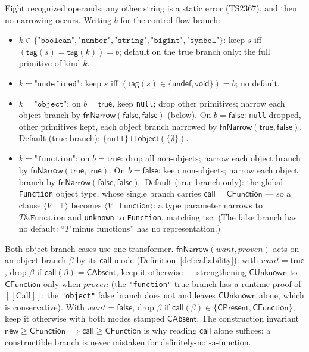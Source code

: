 \documentclass[11pt]{article}
\newcommand{\tagfn}{\mathsf{tag}}
\newcommand{\clause}[2]{\langle #1 \mid #2 \rangle}
\begin{document}
Eight recognized operands; any other string is a static error (TS2367), and
then no narrowing occurs. Writing $b$ for the control-flow branch:
\begin{itemize}
\item $k \in \{\texttt{"boolean"}, \texttt{"number"}, \texttt{"string"},
  \texttt{"bigint"}, \texttt{"symbol"}\}$: keep $s$ iff
  $(\tagfn(s) = \tagfn(k)) = b$; default on the true branch only:
  the full primitive of kind $k$.
\item $k = \texttt{"undefined"}$: keep $s$ iff
  $(\tagfn(s) \in \{\mathsf{undef},\mathsf{void}\}) = b$; no default.
\item $k = \texttt{"object"}$: on $b = \mathsf{true}$, keep \texttt{null};
  drop other primitives; narrow each object branch by
  $\mathsf{fnNarrow}(\mathsf{false}, \mathsf{false})$ (below). On
  $b = \mathsf{false}$: \texttt{null} dropped, other primitives kept,
  each object branch narrowed by
  $\mathsf{fnNarrow}(\mathsf{true}, \mathsf{false})$. Default (true
  branch): $\{\texttt{null}\} \sqcup \mathsf{object}(\{\emptyset\})$.
\item $k = \texttt{"function"}$: on $b = \mathsf{true}$: drop all
  non-objects; narrow each object branch by
  $\mathsf{fnNarrow}(\mathsf{true}, \mathsf{true})$. On
  $b = \mathsf{false}$: keep non-objects; narrow each object branch by
  $\mathsf{fnNarrow}(\mathsf{false}, \mathsf{false})$. Default (true
  branch only): the global \texttt{Function} object type, whose single
  branch carries $\mathsf{call} = \mathsf{CFunction}$ — so a clause
  $\clause{V}{\top}$ becomes $\clause{V}{\mathsf{Function}}$: a type
  parameter narrows to $T \mathbin{\&} \texttt{Function}$ and
  \texttt{unknown} to \texttt{Function}, matching tsc. (The false
  branch has no default: ``$T$ minus functions'' has no
  representation.)
\end{itemize}
Both object-branch cases use one transformer.
$\mathsf{fnNarrow}(\mathit{want}, \mathit{proven})$ acts on an object
branch $\beta$ by its $\mathsf{call}$ mode
(Definition~\ref{def:callability}): with $\mathit{want} = \mathsf{true}$,
drop $\beta$ if $\mathsf{call}(\beta) = \mathsf{CAbsent}$, keep it
otherwise — strengthening $\mathsf{CUnknown}$ to $\mathsf{CFunction}$
only when $\mathit{proven}$ (the \texttt{"function"} true branch has a
runtime proof of $[[\mathrm{Call}]]$; the \texttt{"object"} false branch
does not and leaves $\mathsf{CUnknown}$ alone, which is conservative).
With $\mathit{want} = \mathsf{false}$, drop $\beta$ if
$\mathsf{call}(\beta) \in \{\mathsf{CPresent}, \mathsf{CFunction}\}$,
keep it otherwise with both modes stamped $\mathsf{CAbsent}$. The
construction invariant $\mathsf{new} \ge \mathsf{CFunction} \implies
\mathsf{call} \ge \mathsf{CFunction}$ is why reading $\mathsf{call}$
alone suffices: a constructible branch is never mistaken for
definitely-not-a-function.
\end{document}
